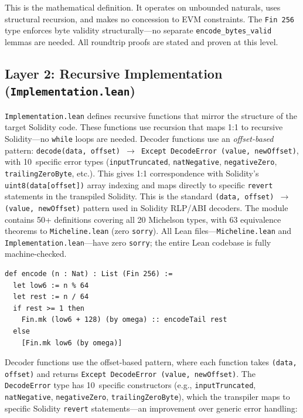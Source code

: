\documentclass[11pt,a4paper]{article}
\begin{document}
This is the mathematical definition. It operates on unbounded naturals, uses
structural recursion, and makes no concession to EVM constraints. The
\texttt{Fin 256} type enforces byte validity structurally---no separate
\texttt{encode\_bytes\_valid} lemmas are needed. All roundtrip
proofs are stated and proven at this level.

\subsection{Layer 2: Recursive Implementation (\texttt{Implementation.lean})}

\texttt{Implementation.lean} defines recursive functions that mirror the
structure of the target Solidity code. These functions use
recursion that maps 1:1 to recursive Solidity---no \texttt{while} loops are
needed.  Decoder functions use an \emph{offset-based} pattern:
\texttt{decode(data, offset) $\to$ Except DecodeError\,(value, newOffset)},
with 10~specific error types (\texttt{inputTruncated}, \texttt{natNegative},
\texttt{negativeZero}, \texttt{trailingZeroByte}, etc.).  This gives 1:1
correspondence with Solidity's \texttt{uint8(data[offset])} array indexing
and maps directly to specific \texttt{revert} statements in the transpiled
Solidity.  This is the standard \texttt{(data, offset) $\to$ (value, newOffset)}
pattern used in Solidity RLP/ABI decoders.  The module contains 50+ definitions
covering all 20 Michelson types, with 63 equivalence theorems to
\texttt{Micheline.lean} (zero \texttt{sorry}).  All Lean files---\texttt{Micheline.lean}
and \texttt{Implementation.lean}---have
zero \texttt{sorry}; the entire Lean codebase is fully machine-checked.

\begin{codebox}
\begin{lstlisting}[language=Lean4]
def encode (n : Nat) : List (Fin 256) :=
  let low6 := n % 64
  let rest := n / 64
  if rest >= 1 then
    Fin.mk (low6 + 128) (by omega) :: encodeTail rest
  else
    [Fin.mk low6 (by omega)]
\end{lstlisting}
\end{codebox}

Decoder functions use the offset-based pattern, where each function takes
\texttt{(data, offset)} and returns \texttt{Except DecodeError\,(value, newOffset)}.
The \texttt{DecodeError} type has 10~specific constructors (e.g.,
\texttt{inputTruncated}, \texttt{natNegative}, \texttt{negativeZero},
\texttt{trailingZeroByte}), which the transpiler maps to specific Solidity
\texttt{revert} statements---an improvement over generic error handling:
\end{document}

